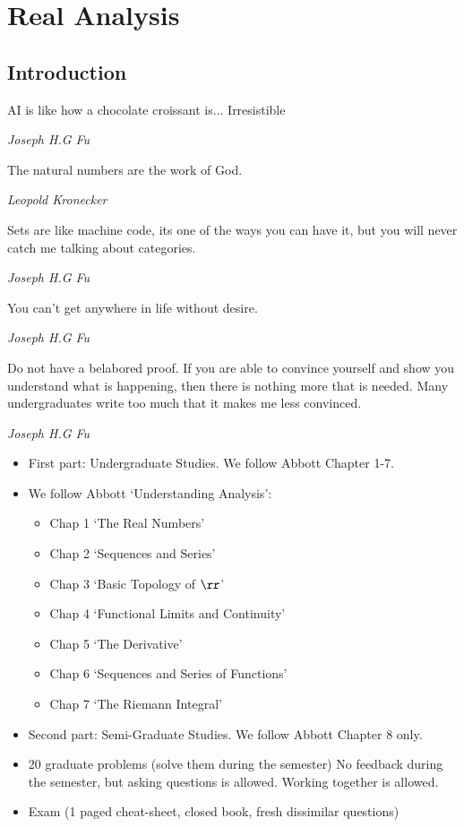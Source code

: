
\part{Real Analysis}

\chapter{Introduction}
\epigraph{AI is like how a chocolate croissant is... Irresistible}{\textit{Joseph H.G Fu}}

\epigraph{The natural numbers are the work of God.}{\textit{Leopold Kronecker}}

\epigraph{Sets are like machine code, its one of the ways you can have it, but you will never catch me talking about categories.}{\textit{Joseph H.G Fu}}

\epigraph{You can't get anywhere in life without desire.}{\textit{Joseph H.G Fu}}

\newpage

\epigraph{Do not have a belabored proof. If you are able to convince yourself and show you understand what is happening, then there is nothing more that is needed. Many undergraduates write too much that it makes me less convinced.}{\textit{Joseph H.G Fu}}

\newpage
\begin{itemize}
    \item First part: Undergraduate Studies. We follow Abbott Chapter 1-7.
    \item We follow Abbott `Understanding Analysis':
    \begin{itemize}
        \item Chap 1 `The Real Numbers'
        \item Chap 2 `Sequences and Series'
        \item Chap 3 `Basic Topology of $\rr$'
        \item Chap 4 `Functional Limits and Continuity'
        \item Chap 5 `The Derivative'
        \item Chap 6 `Sequences and Series of Functions'
        \item Chap 7 `The Riemann Integral'
    \end{itemize}
    \item Second part: Semi-Graduate Studies. We follow Abbott Chapter 8 only.
    \item 20 graduate problems (solve them during the semester) No feedback during the semester, but asking questions is allowed. Working together is allowed.
    \item Exam (1 paged cheat-sheet, closed book, fresh dissimilar questions)
\end{itemize}


